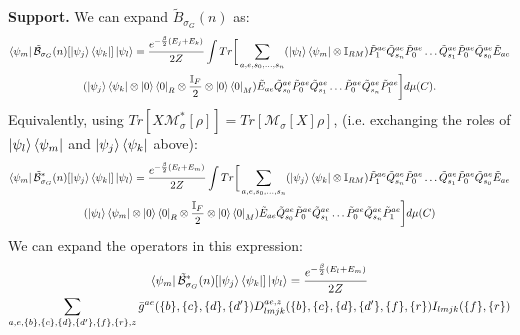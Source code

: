 \documentclass[aps,floatfix,10pt,amssymb,amsfont,amsmath,superscriptaddress,float,nofootinbib,longbibliography,nobalancelastpage,twocolumn]{revtex4-2}
\begin{document}
\textbf{Support.} We can expand $\tilde B_{\sigma_G}(n)$ as:
\begin{multline}
    \bra{\psi_m}\tilde{\mathcal{B}}_{\sigma_G}(n)[\ket{\psi_j}\bra{\psi_k}]\ket{\psi_l} = \frac{e^{-\frac{\beta}{2}(E_j+E_k)}}{2Z}\int Tr\bigg[ \sum_{a,e,s_0,\ldots,s_n}(\ket{\psi_l}\bra{\psi_m}\otimes \mathbb{I}_{RM})\tilde P^{ae}_1\tilde Q^{ae}_{s_n}\tilde P^{ae}_0\ldots\tilde Q^{ae}_{s_1}\tilde P^{ae}_0\tilde Q^{ae}_{s_0}\tilde E_{ae} \\(\ket{\psi_j}\bra{\psi_k}\otimes \ket{0}\bra{0}_R\otimes \frac{\mathbb{I}_F}{2}\otimes \ket{0}\bra{0}_M)  \tilde E_{ae}\tilde Q^{ae}_{s_0}\tilde P^{ae}_0\tilde Q^{ae}_{s_1}\ldots\tilde P^{ae}_0\tilde Q^{ae}_{s_n}\tilde P^{ae}_1\bigg]d\mu(C).
\end{multline}
Equivalently, using $Tr[X\mathcal{M}^*_{\sigma}[\rho]] = Tr[\mathcal{M}_{\sigma}[X]\rho]$, (i.e. exchanging the roles of $\ket{\psi_l}\bra{\psi_m}$ and $\ket{\psi_j}\bra{\psi_k}$ above):
\begin{multline}
       \bra{\psi_m}\tilde{\mathcal{B}}^*_{\sigma_G}(n)[\ket{\psi_j}\bra{\psi_k}]\ket{\psi_l} = \frac{e^{-\frac{\beta}{2}(E_l+E_m)}}{2Z}\int Tr\bigg[ \sum_{a,e,s_0,\ldots,s_n}(\ket{\psi_j}\bra{\psi_k}\otimes \mathbb{I}_{RM})\tilde P^{ae}_1\tilde Q^{ae}_{s_n}\tilde P^{ae}_0\ldots\tilde Q^{ae}_{s_1}\tilde P^{ae}_0\tilde Q^{ae}_{s_0}\tilde E_{ae} \\(\ket{\psi_l}\bra{\psi_m}\otimes \ket{0}\bra{0}_R\otimes \frac{\mathbb{I}_F}{2}\otimes \ket{0}\bra{0}_M)  \tilde E_{ae}\tilde Q^{ae}_{s_0}\tilde P^{ae}_0\tilde Q^{ae}_{s_1}\ldots\tilde P^{ae}_0\tilde Q^{ae}_{s_n}\tilde P^{ae}_1\bigg]d\mu(C)
    \label{eq:Bstarexpanded}
\end{multline}
We can expand the operators in this expression:
\begin{multline}
    \bra{\psi_m}\tilde{\mathcal{B}}^*_{\sigma_G}(n)[\ket{\psi_j}\bra{\psi_k}]\ket{\psi_l} = \frac{e^{-\frac{\beta}{2}(E_l+E_m)}}{2Z}\\\sum_{a,e,\{b\},\{c\},\{d\},\{d'\},\{f\},\{r\},z} \bar g^{ae}(\{b\},\{c\},\{d\},\{d'\}) D^{ae,z}_{lmjk}(\{b\},\{c\},\{d\},\{d'\},\{f\},\{r\})I_{lmjk}(\{f\},\{r\})
    \label{eq:B*def}
\end{multline}
\end{document}
